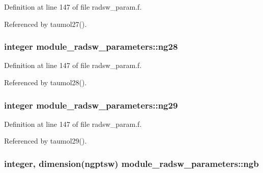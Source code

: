 Definition at line 147 of file radsw\+\_\+param.\+f.



Referenced by taumol27().

\subsubsection[{\texorpdfstring{ng28}{ng28}}]{\setlength{\rightskip}{0pt plus 5cm}integer module\+\_\+radsw\+\_\+parameters\+::ng28}\hypertarget{namespacemodule__radsw__parameters_aa2530abff6c981c3f3e70ef097f90ffc}{}\label{namespacemodule__radsw__parameters_aa2530abff6c981c3f3e70ef097f90ffc}


Definition at line 147 of file radsw\+\_\+param.\+f.



Referenced by taumol28().

\subsubsection[{\texorpdfstring{ng29}{ng29}}]{\setlength{\rightskip}{0pt plus 5cm}integer module\+\_\+radsw\+\_\+parameters\+::ng29}\hypertarget{namespacemodule__radsw__parameters_aa53b1af0366b40653a6f0868858b9f3d}{}\label{namespacemodule__radsw__parameters_aa53b1af0366b40653a6f0868858b9f3d}


Definition at line 147 of file radsw\+\_\+param.\+f.



Referenced by taumol29().

\subsubsection[{\texorpdfstring{ngb}{ngb}}]{\setlength{\rightskip}{0pt plus 5cm}integer, dimension({\bf ngptsw}) module\+\_\+radsw\+\_\+parameters\+::ngb}\hypertarget{namespacemodule__radsw__parameters_afdd8496d7eaa017f7f1e08e998945c1e}{}\label{namespacemodule__radsw__parameters_afdd8496d7eaa017f7f1e08e998945c1e}


